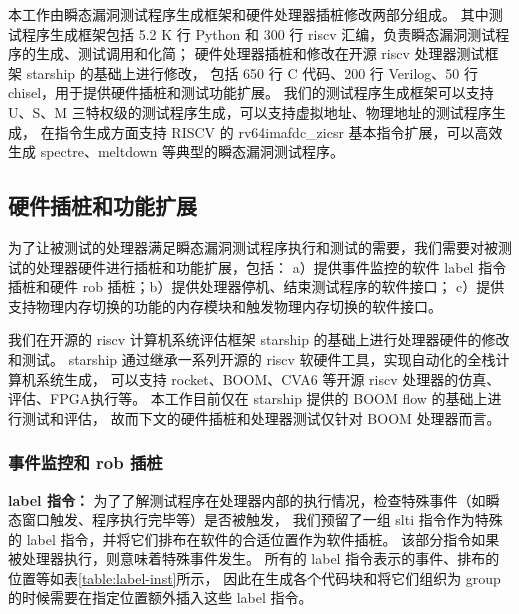 本工作由瞬态漏洞测试程序生成框架和硬件处理器插桩修改两部分组成。
其中测试程序生成框架包括 5.2 K 行 Python 和 300 行 riscv 汇编，负责瞬态漏洞测试程序的生成、测试调用和化简；
硬件处理器插桩和修改在开源 riscv 处理器测试框架 starship\cite{starship} 的基础上进行修改，
包括 650 行 C 代码、200 行 Verilog、50 行 chisel，用于提供硬件插桩和测试功能扩展。
我们的测试程序生成框架可以支持 U、S、M 三特权级的测试程序生成，可以支持虚拟地址、物理地址的测试程序生成，
在指令生成方面支持 RISCV 的 rv64imafdc\_zicsr 基本指令扩展，可以高效生成 spectre、meltdown 等典型的瞬态漏洞测试程序。\par

\subsection{硬件插桩和功能扩展}

为了让被测试的处理器满足瞬态漏洞测试程序执行和测试的需要，我们需要对被测试的处理器硬件进行插桩和功能扩展，包括：
a）提供事件监控的软件 label 指令插桩和硬件 rob 插桩；b）提供处理器停机、结束测试程序的软件接口；
c）提供支持物理内存切换的功能的内存模块和触发物理内存切换的软件接口。\par

我们在开源的 riscv 计算机系统评估框架 starship 的基础上进行处理器硬件的修改和测试。
starship 通过继承一系列开源的 riscv 软硬件工具，实现自动化的全栈计算机系统生成，
可以支持 rocket、BOOM、CVA6 等开源 riscv 处理器的仿真、评估、FPGA执行等。
本工作目前仅在 starship 提供的 BOOM flow 的基础上进行测试和评估，
故而下文的硬件插桩和处理器测试仅针对 BOOM 处理器而言。\par

\subsubsection{事件监控和 rob 插桩}
\textbf{label 指令：}
为了了解测试程序在处理器内部的执行情况，检查特殊事件（如瞬态窗口触发、程序执行完毕等）是否被触发，
我们预留了一组 slti 指令作为特殊的 label 指令，并将它们排布在软件的合适位置作为软件插桩。
该部分指令如果被处理器执行，则意味着特殊事件发生。
所有的 label 指令表示的事件、排布的位置等如表\ref{table:label-inst}所示，
因此在生成各个代码块和将它们组织为 group 的时候需要在指定位置额外插入这些 label 指令。\par

